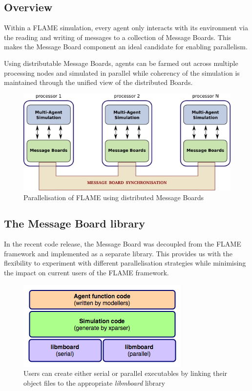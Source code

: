 \subsection{Overview}

Within a FLAME simulation, every agent only interacts with its environment via the reading and writing of messages to a collection of Message Boards. This makes the Message Board component an ideal candidate for enabling parallelism. 

Using distributable Message Boards, agents can be farmed out across multiple processing nodes and simulated in parallel while coherency of the simulation is maintained through the unified view of the distributed Boards.

\begin{figure}[h]
 \centering
  \includegraphics[scale=0.50]{mboard_flame.jpg}
 \caption{Parallelisation of FLAME using distributed Message Boards}
 \label{fig:mb_flame}
\end{figure}

\subsection{The Message Board library}
In the recent code release, the Message Board was decoupled from the FLAME framework and implemented as a separate library. This provides us with the flexibility to experiment with different parallelisation strategies while minimising the impact on current users of the FLAME framework.

\begin{figure}[h]
 \centering
  \includegraphics[scale=0.50]{mboard_overview.png}
 \caption{Users can create either serial or parallel executables by linking their object files to the appropriate \textit{libmboard} library}
 \label{fig:mb_overview}
\end{figure}

